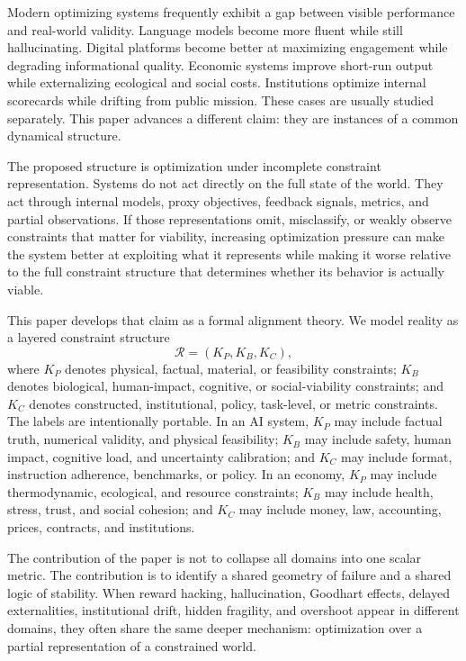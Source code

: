 \documentclass[11pt]{article}
\newcommand{\KP}{K_P}
\newcommand{\KB}{K_B}
\newcommand{\KC}{K_C}
\newcommand{\R}{\mathcal{R}}
\begin{document}
Modern optimizing systems frequently exhibit a gap between visible performance and real-world validity. Language models become more fluent while still hallucinating. Digital platforms become better at maximizing engagement while degrading informational quality. Economic systems improve short-run output while externalizing ecological and social costs. Institutions optimize internal scorecards while drifting from public mission. These cases are usually studied separately. This paper advances a different claim: they are instances of a common dynamical structure.

The proposed structure is optimization under incomplete constraint representation. Systems do not act directly on the full state of the world. They act through internal models, proxy objectives, feedback signals, metrics, and partial observations. If those representations omit, misclassify, or weakly observe constraints that matter for viability, increasing optimization pressure can make the system better at exploiting what it represents while making it worse relative to the full constraint structure that determines whether its behavior is actually viable.

This paper develops that claim as a formal alignment theory. We model reality as a layered constraint structure
\[
\R = (\KP,\KB,\KC),
\]
where \(\KP\) denotes physical, factual, material, or feasibility constraints; \(\KB\) denotes biological, human-impact, cognitive, or social-viability constraints; and \(\KC\) denotes constructed, institutional, policy, task-level, or metric constraints. The labels are intentionally portable. In an AI system, \(\KP\) may include factual truth, numerical validity, and physical feasibility; \(\KB\) may include safety, human impact, cognitive load, and uncertainty calibration; and \(\KC\) may include format, instruction adherence, benchmarks, or policy. In an economy, \(\KP\) may include thermodynamic, ecological, and resource constraints; \(\KB\) may include health, stress, trust, and social cohesion; and \(\KC\) may include money, law, accounting, prices, contracts, and institutions.

The contribution of the paper is not to collapse all domains into one scalar metric. The contribution is to identify a shared geometry of failure and a shared logic of stability. When reward hacking, hallucination, Goodhart effects, delayed externalities, institutional drift, hidden fragility, and overshoot appear in different domains, they often share the same deeper mechanism: optimization over a partial representation of a constrained world.
\end{document}
